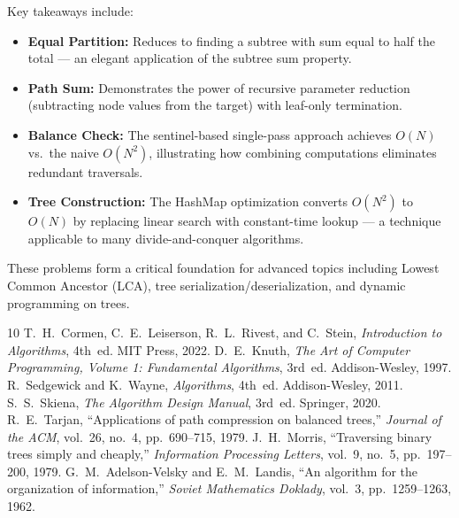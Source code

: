 \documentclass[10pt,journal,compsoc,onecolumn]{IEEEtran}
\begin{document}
Key takeaways include:
\begin{itemize}
    \item \textbf{Equal Partition:} Reduces to finding a subtree with sum equal to half the total --- an elegant application of the subtree sum property.
    \item \textbf{Path Sum:} Demonstrates the power of recursive parameter reduction (subtracting node values from the target) with leaf-only termination.
    \item \textbf{Balance Check:} The sentinel-based single-pass approach achieves $O(N)$ vs.\ the naive $O(N^2)$, illustrating how combining computations eliminates redundant traversals.
    \item \textbf{Tree Construction:} The HashMap optimization converts $O(N^2)$ to $O(N)$ by replacing linear search with constant-time lookup --- a technique applicable to many divide-and-conquer algorithms.
\end{itemize}

These problems form a critical foundation for advanced topics including Lowest Common Ancestor (LCA), tree serialization/deserialization, and dynamic programming on trees.

\begin{thebibliography}{10}
 T.~H.~Cormen, C.~E.~Leiserson, R.~L.~Rivest, and C.~Stein, \emph{Introduction to Algorithms}, 4th~ed. MIT Press, 2022.
 D.~E.~Knuth, \emph{The Art of Computer Programming, Volume 1: Fundamental Algorithms}, 3rd~ed. Addison-Wesley, 1997.
 R.~Sedgewick and K.~Wayne, \emph{Algorithms}, 4th~ed. Addison-Wesley, 2011.
 S.~S.~Skiena, \emph{The Algorithm Design Manual}, 3rd~ed. Springer, 2020.
 R.~E.~Tarjan, ``Applications of path compression on balanced trees,'' \emph{Journal of the ACM}, vol.~26, no.~4, pp.~690--715, 1979.
 J.~H.~Morris, ``Traversing binary trees simply and cheaply,'' \emph{Information Processing Letters}, vol.~9, no.~5, pp.~197--200, 1979.
 G.~M.~Adelson-Velsky and E.~M.~Landis, ``An algorithm for the organization of information,'' \emph{Soviet Mathematics Doklady}, vol.~3, pp.~1259--1263, 1962.
\end{thebibliography}
\end{document}
